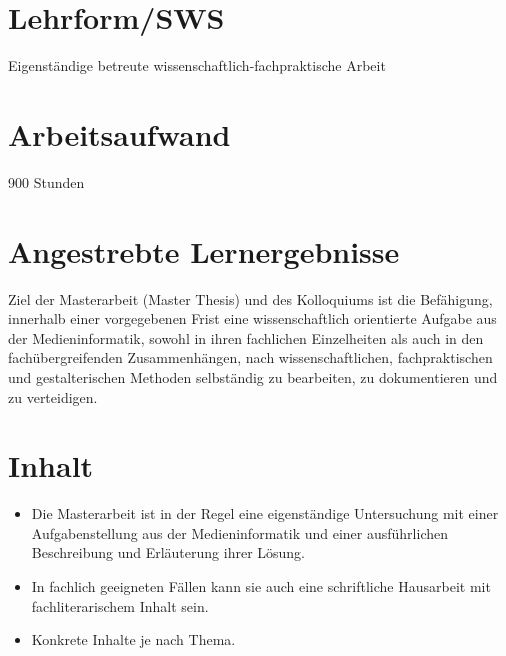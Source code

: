 \section*{Lehrform/SWS
\label{/mi-2017/modulbeschreibungen-master/MA_All_Modul_Masterarbeit}}\label{lehrformsws-pathlabelmi-2017modulbeschreibungen-mastermaux5fallux5fmodulux5fmasterarbeit}

Eigenständige betreute wissenschaftlich-fachpraktische Arbeit

\section*{Arbeitsaufwand
\label{/mi-2017/modulbeschreibungen-master/MA_All_Modul_Masterarbeit}}\label{arbeitsaufwand-pathlabelmi-2017modulbeschreibungen-mastermaux5fallux5fmodulux5fmasterarbeit}

900 Stunden

\section*{Angestrebte
Lernergebnisse\label{/mi-2017/modulbeschreibungen-master/MA_All_Modul_Masterarbeit}}\label{angestrebte-lernergebnissepathlabelmi-2017modulbeschreibungen-mastermaux5fallux5fmodulux5fmasterarbeit}

Ziel der Masterarbeit (Master Thesis) und des Kolloquiums ist die
Befähigung, innerhalb einer vorgegebenen Frist eine wissenschaftlich
orientierte Aufgabe aus der Medieninformatik, sowohl in ihren fachlichen
Einzelheiten als auch in den fachübergreifenden Zusammenhängen, nach
wissenschaftlichen, fachpraktischen und gestalterischen Methoden
selbständig zu bearbeiten, zu dokumentieren und zu verteidigen.

\section*{Inhalt\label{/mi-2017/modulbeschreibungen-master/MA_All_Modul_Masterarbeit}}\label{inhaltpathlabelmi-2017modulbeschreibungen-mastermaux5fallux5fmodulux5fmasterarbeit}

\begin{itemize}
\tightlist
\item
  Die Masterarbeit ist in der Regel eine eigenständige Untersuchung mit
  einer Aufgabenstellung aus der Medieninformatik und einer
  ausführlichen Beschreibung und Erläuterung ihrer Lösung.
\item
  In fachlich geeigneten Fällen kann sie auch eine schriftliche
  Hausarbeit mit fachliterarischem Inhalt sein.
\item
  Konkrete Inhalte je nach Thema.
\end{itemize}


